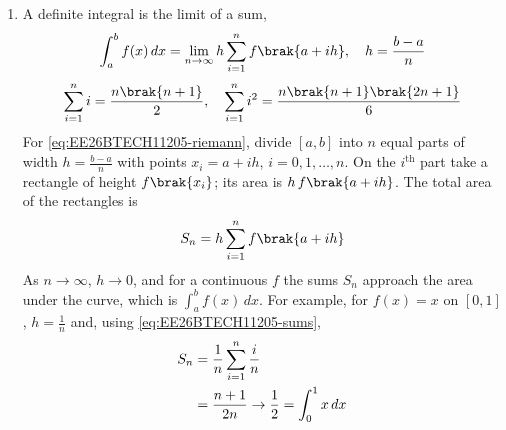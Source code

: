 \begin{enumerate}[label=\thesubsection.\arabic*, ref=\thesubsection.\theenumi]
\medskip
\solution Divide $[a,b]$ into $n$ strips of width $h = \frac{b-a}{n}$. The strip at $x$ has area approximately $f(x)\,h$, and adding the strips and letting $n \to \infty$ gives the area $\int_a^b f(x)\,dx$, as in \eqref{eq:EE26BTECH11205-riemann}. For the circle, put $x = r\sin\theta$ with $\theta \in \sbrak{-\frac{\pi}{2},\frac{\pi}{2}}$, so $\sqrt{r^2-x^2} = r\cos\theta$ and $dx = r\cos\theta\,d\theta$. Then
\begin{align}
	\int\sqrt{r^2-x^2}\,dx &= r^2\int\cos^2\theta\,d\theta \notag
	\\
	&= \frac{r^2}{2}\int\brak{1+\cos 2\theta}\,d\theta \notag
	\\
	&= \frac{r^2}{2}\brak{\theta + \sin\theta\cos\theta} + c
\end{align}
Using $\theta = \sin^{-1}\frac{x}{r}$ and $\sin\theta\cos\theta = \frac{x}{r}\cdot\frac{\sqrt{r^2-x^2}}{r}$,
\begin{align}
	\int\sqrt{r^2-x^2}\,dx = \frac{x}{2}\sqrt{r^2-x^2} + \frac{r^2}{2}\sin^{-1}\frac{x}{r} + c
\end{align}
\item A definite integral is the limit of a sum,
\begin{align}
	\int_{a}^{b}f(x)\,dx = \lim_{n\to\infty}h\sum_{i=1}^{n}f\brak{a+ih},\quad h = \frac{b-a}{n} \label{eq:EE26BTECH11205-riemann}
\end{align}
\begin{align}
	\sum_{i=1}^{n}i = \frac{n\brak{n+1}}{2},\quad \sum_{i=1}^{n}i^2 = \frac{n\brak{n+1}\brak{2n+1}}{6} \label{eq:EE26BTECH11205-sums}
\end{align}
\solution For \eqref{eq:EE26BTECH11205-riemann}, divide $[a,b]$ into $n$ equal parts of width $h = \frac{b-a}{n}$ with points $x_i = a+ih$, $i = 0,1,\dots,n$. On the $i^{\text{th}}$ part take a rectangle of height $f\brak{x_i}$; its area is $h\,f\brak{a+ih}$. The total area of the rectangles is
\begin{align}
	S_n = h\sum_{i=1}^{n}f\brak{a+ih}
\end{align}
As $n \to \infty$, $h \to 0$, and for a continuous $f$ the sums $S_n$ approach the area under the curve, which is $\int_a^b f(x)\,dx$. For example, for $f(x) = x$ on $[0,1]$, $h = \frac{1}{n}$ and, using \eqref{eq:EE26BTECH11205-sums},
\begin{align}
	S_n &= \frac{1}{n}\sum_{i=1}^{n}\frac{i}{n} \notag
	\\
	&= \frac{n+1}{2n} \to \frac{1}{2} = \int_0^1 x\,dx
\end{align}


\end{enumerate}
